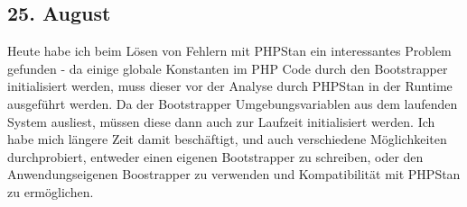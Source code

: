 \subsection{25. August}
Heute habe ich beim Lösen von Fehlern mit PHPStan ein interessantes Problem gefunden - da einige globale Konstanten im PHP Code durch den Bootstrapper initialisiert werden, muss dieser vor der Analyse durch PHPStan in der Runtime ausgeführt werden. Da der Bootstrapper Umgebungsvariablen aus dem laufenden System ausliest, müssen diese dann auch zur Laufzeit initialisiert werden. Ich habe mich längere Zeit damit beschäftigt, und auch verschiedene Möglichkeiten durchprobiert, entweder einen eigenen Bootstrapper zu schreiben, oder den Anwendungseigenen Boostrapper zu verwenden und Kompatibilität mit PHPStan zu ermöglichen.